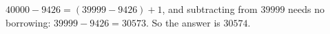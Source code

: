 $40000-9426=(39999-9426)+1$, and subtracting from $39999$ needs no borrowing: $39999-9426=30573$. So the answer is $\boxed{30574}$.
